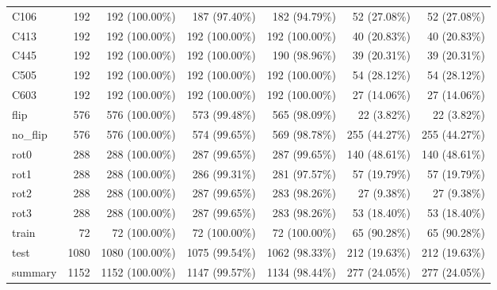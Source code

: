 \begin{longtable}{>{\raggedright\arraybackslash}p{5cm}rrrrrr}
C106 & 192 & 192 (100.00\%) & 187 (97.40\%) & 182 (94.79\%) & 52 (27.08\%) & 52 (27.08\%) \\
C413 & 192 & 192 (100.00\%) & 192 (100.00\%) & 192 (100.00\%) & 40 (20.83\%) & 40 (20.83\%) \\
C445 & 192 & 192 (100.00\%) & 192 (100.00\%) & 190 (98.96\%) & 39 (20.31\%) & 39 (20.31\%) \\
C505 & 192 & 192 (100.00\%) & 192 (100.00\%) & 192 (100.00\%) & 54 (28.12\%) & 54 (28.12\%) \\
C603 & 192 & 192 (100.00\%) & 192 (100.00\%) & 192 (100.00\%) & 27 (14.06\%) & 27 (14.06\%) \\
flip & 576 & 576 (100.00\%) & 573 (99.48\%) & 565 (98.09\%) & 22 (3.82\%) & 22 (3.82\%) \\
no\_flip & 576 & 576 (100.00\%) & 574 (99.65\%) & 569 (98.78\%) & 255 (44.27\%) & 255 (44.27\%) \\
rot0 & 288 & 288 (100.00\%) & 287 (99.65\%) & 287 (99.65\%) & 140 (48.61\%) & 140 (48.61\%) \\
rot1 & 288 & 288 (100.00\%) & 286 (99.31\%) & 281 (97.57\%) & 57 (19.79\%) & 57 (19.79\%) \\
rot2 & 288 & 288 (100.00\%) & 287 (99.65\%) & 283 (98.26\%) & 27 (9.38\%) & 27 (9.38\%) \\
rot3 & 288 & 288 (100.00\%) & 287 (99.65\%) & 283 (98.26\%) & 53 (18.40\%) & 53 (18.40\%) \\
train & 72 & 72 (100.00\%) & 72 (100.00\%) & 72 (100.00\%) & 65 (90.28\%) & 65 (90.28\%) \\
test & 1080 & 1080 (100.00\%) & 1075 (99.54\%) & 1062 (98.33\%) & 212 (19.63\%) & 212 (19.63\%) \\
summary & 1152 & 1152 (100.00\%) & 1147 (99.57\%) & 1134 (98.44\%) & 277 (24.05\%) & 277 (24.05\%) \\
\end{longtable}
